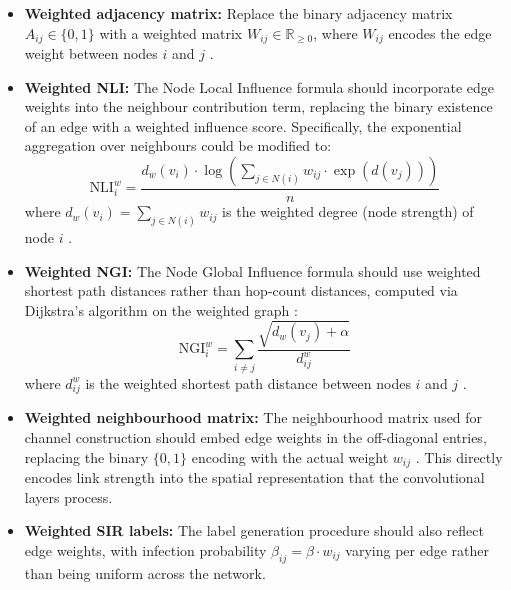 \begin{itemize}
    \item \textbf{Weighted adjacency matrix:} Replace the binary
    adjacency matrix $A_{ij} \in \{0, 1\}$ with a weighted matrix
    $W_{ij} \in \mathbb{R}_{\geq 0}$, where $W_{ij}$ encodes the
    edge weight between nodes $i$ and $j$ \cite{zhang2019gcn}.

    \item \textbf{Weighted NLI:} The Node Local Influence formula
    should incorporate edge weights into the neighbour contribution
    term, replacing the binary existence of an edge with a
    weighted influence score. Specifically, the exponential
    aggregation over neighbours could be modified to:
    \begin{equation}
        \text{NLI}_i^{w} = \frac{d_w(v_i) \cdot
        \log\!\left(\sum_{j \in N(i)} w_{ij} \cdot
        \exp\!\left(d(v_j)\right)\right)}{n}
    \end{equation}
    where $d_w(v_i) = \sum_{j \in N(i)} w_{ij}$ is the weighted
    degree (node strength) of node $i$ \cite{guo2026, mukhtar}.

    \item \textbf{Weighted NGI:} The Node Global Influence formula
    should use weighted shortest path distances rather than
    hop-count distances, computed via Dijkstra's algorithm on
    the weighted graph \cite{farooq2018, chen2012}:
    \begin{equation}
        \text{NGI}_i^{w} = \sum_{i \neq j}
        \frac{\sqrt{d_w(v_j) + \alpha}}{d_{ij}^{w}}
    \end{equation}
    where $d_{ij}^{w}$ is the weighted shortest path distance
    between nodes $i$ and $j$ \cite{guo2026}.

    \item \textbf{Weighted neighbourhood matrix:} The neighbourhood
    matrix used for channel construction should embed edge weights
    in the off-diagonal entries, replacing the binary $\{0, 1\}$
    encoding with the actual weight $w_{ij}$ \cite{tu2025, patel2025}.
    This directly encodes link strength into the spatial
    representation that the convolutional layers process.

    \item \textbf{Weighted SIR labels:} The label generation
    procedure should also reflect edge weights, with infection
    probability $\beta_{ij} = \beta \cdot w_{ij}$ varying per
    edge rather than being uniform across the network.
\end{itemize}

